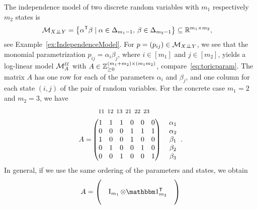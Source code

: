 \begin{example}
	\label{ex:indep}
	The independence model of two discrete random variables with $m_1$ respectively $m_2$ states is
	\begin{equation*}
		\begin{split}
			\mathcal{M}_{X {\perp\!\!\!\perp} Y} &= \big\{ \alpha^{\mathsf{T}} \beta \mid \alpha \in \Delta_{m_1 - 1}, \, \beta\in \Delta_{m_2 - 1} \big\} \subseteq \mathbb R^{m_1 \times m_2},
		\end{split}
	\end{equation*}
	see Example~\ref{ex:IndependenceModel}. For $p = (p_{ij}) \in \mathcal{M}_{X {\perp\!\!\!\perp} Y}$, we see that the monomial parametrization $p_{ij} = \alpha_i \beta_j$, where $i \in [m_1]$ and $j \in [m_2]$, yields a log-linear model $\mathcal{M}^{\mathtt{\ell \ell}}_A$ with $A \in \mathbb Z_{\geq 0}^{(m_1 + m_2) \times (m_1 m_2)}$, compare~\eqref{eq:toricparam}. The matrix $A$ has one row for each of the parameters $\alpha_i$ and $\beta_j$, and one column for each state $(i,j)$ of the pair of random variables. For the concrete case $m_1 = 2$ and $m_2 = 3$, we have
		\begin{align*}
			& \quad {\footnotesize \begin{matrix}
					11\!\!\!\! & 12\!\!\!\! & 13\!\!\!\! & 21\!\!\!\! & 22\!\!\!\! & 23
				\end{matrix}} \\
			A = &\begin{pmatrix}
				1 & 1 & 1 & 0 & 0 & 0 \\
				0 & 0 & 0 & 1 & 1 & 1 \\
				1 & 0 & 0 & 1 & 0 & 0 \\
				0 & 1 & 0 & 0 & 1 & 0 \\
				0 & 0 & 1 & 0 & 0 & 1 \\
			\end{pmatrix} \quad \begin{matrix} \alpha_1 \\ \alpha_2 \\ \beta_1 \\ \beta_2 \\ \beta_3 \end{matrix} \;\;.
		\end{align*}
	In general, if we use the same ordering of the parameters and states, we obtain
		\begin{equation}\label{eqn:Aforindependence}
			A = \begin{pmatrix} & & \\ & \Id_{m_1} \otimes \ones\T_{m_2} & \\ & &  \\ 

\end{pmatrix}
\end{equation}
\end{example}
